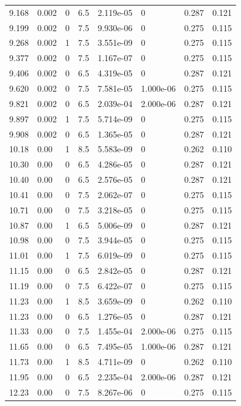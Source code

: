 \documentclass[preview]{standalone}
\begin{document}
{{{\begin{tabular}{L{1.2cm}C{1.2cm} C{0.3cm}C{0.5cm} C{1.4cm}C{1.4cm} C{1.4cm}C{1.4cm}}
  9.168  &  0.002  & 0     & 6.5 &  2.119e-05  & 0  & 0.287 &  0.121   \\ 
  9.199  &  0.002  & 0     & 7.5 &  9.930e-06  & 0  & 0.275 &  0.115   \\ 
  9.268  &  0.002  & 1     & 7.5 &  3.551e-09  & 0  & 0.275 &  0.115   \\ 
  9.377  &  0.002  & 0     & 7.5 &  1.167e-07  & 0  & 0.275 &  0.115   \\ 
  9.406  &  0.002  & 0     & 6.5 &  4.319e-05  & 0  & 0.287 &  0.121   \\ 
  9.620  &  0.002  & 0     & 7.5 &  7.581e-05  & 1.000e-06  & 0.275 &  0.115   \\ 
  9.821  &  0.002  & 0     & 6.5 &  2.039e-04  & 2.000e-06  & 0.287 &  0.121   \\ 
  9.897  &  0.002  & 1     & 7.5 &  5.714e-09  & 0  & 0.275 &  0.115   \\ 
  9.908  &  0.002  & 0     & 6.5 &  1.365e-05  & 0  & 0.287 &  0.121   \\ 
  10.18  &  0.00  & 1     & 8.5 &  5.583e-09  & 0  & 0.262 &  0.110   \\ 
  10.30  &  0.00  & 0     & 6.5 &  4.286e-05  & 0  & 0.287 &  0.121   \\ 
  10.40  &  0.00  & 0     & 6.5 &  2.576e-05  & 0  & 0.287 &  0.121   \\ 
  10.41  &  0.00  & 0     & 7.5 &  2.062e-07  & 0  & 0.275 &  0.115   \\ 
  10.71  &  0.00  & 0     & 7.5 &  3.218e-05  & 0  & 0.275 &  0.115   \\ 
  10.87  &  0.00  & 1     & 6.5 &  5.006e-09  & 0  & 0.287 &  0.121   \\ 
  10.98  &  0.00  & 0     & 7.5 &  3.944e-05  & 0  & 0.275 &  0.115   \\ 
  11.01  &  0.00  & 1     & 7.5 &  6.019e-09  & 0  & 0.275 &  0.115   \\ 
  11.15  &  0.00  & 0     & 6.5 &  2.842e-05  & 0  & 0.287 &  0.121   \\ 
  11.19  &  0.00  & 0     & 7.5 &  6.422e-07  & 0  & 0.275 &  0.115   \\ 
  11.23  &  0.00  & 1     & 8.5 &  3.659e-09  & 0  & 0.262 &  0.110   \\ 
  11.23  &  0.00  & 0     & 6.5 &  1.276e-05  & 0  & 0.287 &  0.121   \\ 
  11.33  &  0.00  & 0     & 7.5 &  1.455e-04  & 2.000e-06  & 0.275 &  0.115   \\ 
  11.65  &  0.00  & 0     & 6.5 &  7.495e-05  & 1.000e-06  & 0.287 &  0.121   \\ 
  11.73  &  0.00  & 1     & 8.5 &  4.711e-09  & 0  & 0.262 &  0.110   \\ 
  11.95  &  0.00  & 0     & 6.5 &  2.235e-04  & 2.000e-06  & 0.287 &  0.121   \\ 
  12.23  &  0.00  & 0     & 7.5 &  8.267e-06  & 0  & 0.275 &  0.115   \\ 
\hline 
\end{tabular} 

}}}
\end{document}
